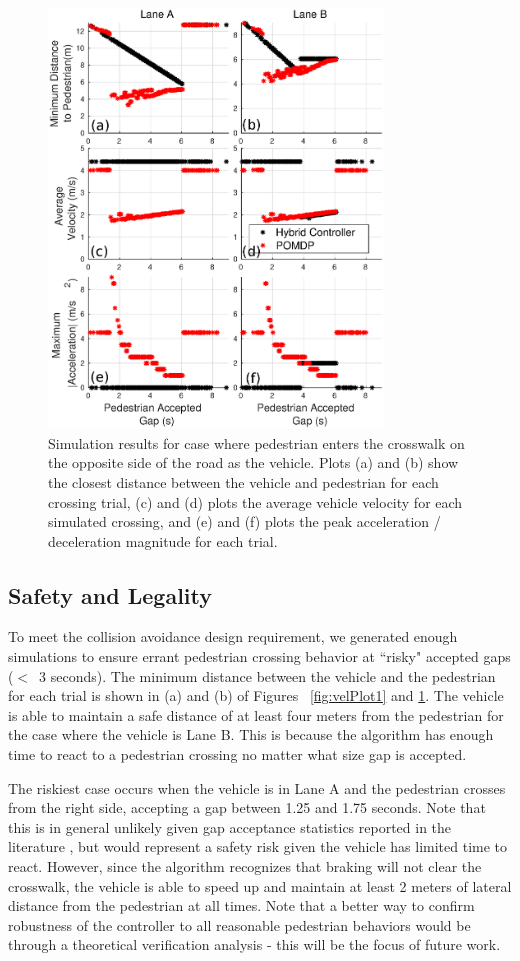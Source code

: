 \documentclass[letterpaper, 10 pt, conference]{ieeeconf}  %
\begin{document}
\begin{figure}
\centering
\includegraphics[width=3.5in]{figures/velPlot2Both.eps}
\caption{Simulation results for case where pedestrian enters the crosswalk on the opposite side of the road as the vehicle. Plots (a) and (b) show the closest distance between the vehicle and pedestrian for each crossing trial, (c) and (d) plots the average vehicle velocity for each simulated crossing, and (e) and (f) plots the peak acceleration / deceleration magnitude for each trial.}
\label{fig:velPlot2}
\end{figure}

\subsection{Safety and Legality}

To meet the collision avoidance design requirement, we generated enough simulations to ensure errant pedestrian crossing behavior at ``risky" accepted gaps ($<$~3 seconds). The minimum distance between the vehicle and the pedestrian for each trial is shown in (a) and (b) of Figures ~\ref{fig:velPlot1} and \ref{fig:velPlot2}. The vehicle is able to maintain a safe distance of at least four meters from the pedestrian for the case where the vehicle is Lane B. This is because the algorithm has enough time to react to a pedestrian crossing no matter what size gap is accepted. 

The riskiest case occurs when the vehicle is in Lane A and the pedestrian crosses from the right side, accepting a gap between 1.25 and 1.75 seconds. Note that this is in general unlikely given gap acceptance statistics reported in the literature \cite{Rasouli}\cite{Feliciani2017}, but would represent a safety risk given the vehicle has limited time to react. However, since the algorithm recognizes that braking will not clear the crosswalk, the vehicle is able to speed up and maintain at least 2 meters of lateral distance from the pedestrian at all times. Note that a better way to confirm robustness of the controller to all reasonable pedestrian behaviors would be through a theoretical verification analysis - this will be the focus of future work. 
\end{document}
